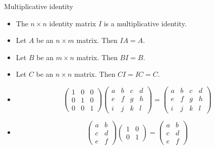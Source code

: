 \documentclass{beamer}
\begin{document}

\beamerdefaultoverlayspecification{<+->}

\begin{frame}{Multiplicative identity}
\begin{itemize}
\item The $n\times n$ identity matrix $I$ is a multiplicative identity.
\item Let $A$ be an $n\times m$ matrix. Then $I A = A$.
\item Let $B$ be an $m \times n$ matrix. Then $B I = B$.
\item Let $C$ be an $n\times n$ matrix. Then $C I = I C = C$.
\item
$$
\begin{pmatrix}
1 & 0 & 0 \\
0 & 1 & 0 \\
0 & 0 & 1
\end{pmatrix}
\begin{pmatrix}
a & b & c & d \\
e & f & g & h \\
i & j & k & l
\end{pmatrix}
=
\begin{pmatrix}
a & b & c & d \\
e & f & g & h \\
i & j & k & l
\end{pmatrix}
$$
\item
$$
\begin{pmatrix}
a & b \\
c & d \\
e & f
\end{pmatrix}
\begin{pmatrix}
1 & 0\\
0 & 1
\end{pmatrix}
=
\begin{pmatrix}
a & b  \\
c & d  \\
e & f
\end{pmatrix}
$$
\end{itemize}
\end{frame}

\end{document}
